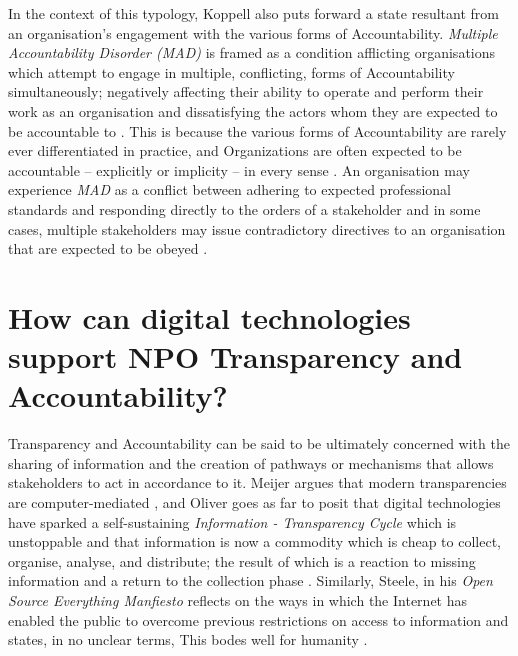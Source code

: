 In the context of this typology, Koppell also puts forward a state resultant from an organisation's engagement with the various forms of Accountability. \textit{Multiple Accountability Disorder (MAD)} is framed as a condition afflicting organisations which attempt to engage in multiple, conflicting, forms of Accountability simultaneously; negatively affecting their ability to operate and perform their work as an organisation and dissatisfying the actors whom they are expected to be accountable to \cite{koppell_pathologies_2005}. This is because the various forms of Accountability are rarely ever differentiated in practice, and Organizations are often expected to be accountable -- explicitly or implicity -- in every sense \cite{koppell_pathologies_2005}. An organisation may experience \textit{MAD} as a conflict between adhering to expected professional standards and responding directly to the orders of a stakeholder and in some cases, multiple stakeholders may issue contradictory directives to an organisation that are expected to be obeyed \cite{koppell_pathologies_2005}.




%
%
\section{How can digital technologies support NPO Transparency and Accountability?}
Transparency and Accountability can be said to be ultimately concerned with the sharing of information and the creation of pathways or mechanisms that allows stakeholders to act in accordance to it. Meijer argues that modern transparencies are computer-mediated \cite{meijer_understanding_2009}, and Oliver goes as far to posit that digital technologies have sparked a self-sustaining \textit{Information - Transparency Cycle} which is unstoppable and that information is now a commodity which is cheap to collect, organise, analyse, and distribute; the result of which is a reaction to missing information and a return to the collection phase \cite{oliver_what_2004}. Similarly, Steele, in his \textit{Open Source Everything Manfiesto} reflects on the ways in which the Internet has enabled the public to overcome previous restrictions on access to information and states, in no unclear terms, This bodes well for humanity \cite{steele_open-source_2012}.

